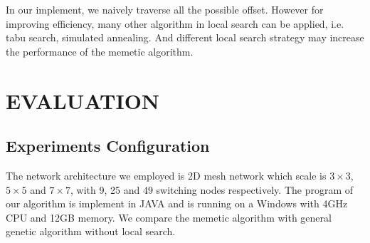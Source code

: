 \documentclass[journal]{IEEEtran}
\theoremstyle{remark}
\begin{document}
In our implement,
 we naively traverse all the possible offset.
However for improving efficiency,
 many other algorithm in local search can be applied,
  i.e. tabu search, simulated annealing.
And different local search strategy may increase the performance of the memetic algorithm.

\section{EVALUATION\label{s:evalu}}

\subsection{Experiments Configuration}






The network architecture we employed is 2D mesh network which scale is $3\times 3$, $5\times 5$ and $7\times 7$,
 with 9, 25 and 49 switching nodes respectively.
The program of our algorithm is implement in JAVA and is running on a Windows with 4GHz CPU and 12GB memory.
We compare the memetic algorithm with general genetic algorithm without local search. 
\end{document}
